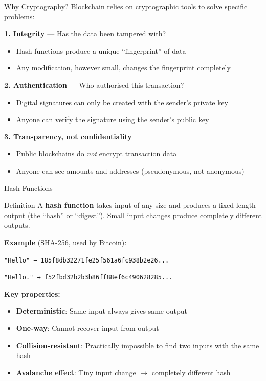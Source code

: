 \documentclass[10pt]{beamer}
\begin{document}
\begin{frame}{Why Cryptography?}
  Blockchain relies on cryptographic tools to solve specific problems:
  
  \vspace{1em}
  \textbf{1. Integrity} --- Has the data been tampered with?
  \begin{itemize}
    \item Hash functions produce a unique ``fingerprint'' of data
    \item Any modification, however small, changes the fingerprint completely
  \end{itemize}
  
  \vspace{0.5em}
  \textbf{2. Authentication} --- Who authorised this transaction?
  \begin{itemize}
    \item Digital signatures can only be created with the sender's private key
    \item Anyone can verify the signature using the sender's public key
  \end{itemize}
  
  \vspace{0.5em}
  \textbf{3. Transparency, not confidentiality}
  \begin{itemize}
    \item Public blockchains do \textit{not} encrypt transaction data
    \item Anyone can see amounts and addresses (pseudonymous, not anonymous)
  \end{itemize}
\end{frame}

\begin{frame}{Hash Functions}
  \begin{block}{Definition}
    A \textbf{hash function} takes input of any size and produces a fixed-length output (the ``hash'' or ``digest''). Small input changes produce completely different outputs.
  \end{block}
  
  \vspace{0.5em}
  \textbf{Example} (SHA-256, used by Bitcoin):
  
  \vspace{0.3em}
  \texttt{\small "Hello" → 185f8db32271fe25f561a6fc938b2e26...}
  
  \texttt{\small "Hello." → f52fbd32b2b3b86ff88ef6c490628285...}
  
  \vspace{1em}
  \textbf{Key properties:}
  \begin{itemize}
    \item \textbf{Deterministic}: Same input always gives same output
    \item \textbf{One-way}: Cannot recover input from output
    \item \textbf{Collision-resistant}: Practically impossible to find two inputs with the same hash
    \item \textbf{Avalanche effect}: Tiny input change $\rightarrow$ completely different hash
  \end{itemize}
\end{frame}
\end{document}

